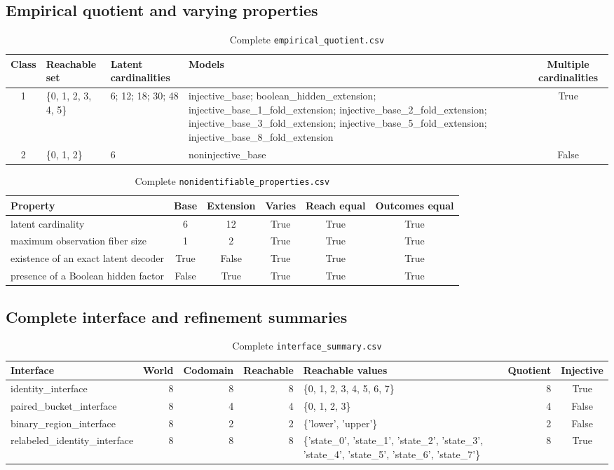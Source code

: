 \subsection{Empirical quotient and varying properties}
\begin{table}[H]
\centering
\caption{Complete \texttt{empirical\_quotient.csv}}
\scriptsize
\begin{tabularx}{\textwidth}{@{}cXlXc@{}}
\toprule
Class & Reachable set & Latent cardinalities & Models & Multiple cardinalities \\
\midrule
1 & \{0, 1, 2, 3, 4, 5\} & 6; 12; 18; 30; 48 & injective\_base; boolean\_hidden\_extension; injective\_base\_1\_fold\_extension; injective\_base\_2\_fold\_extension; injective\_base\_3\_fold\_extension; injective\_base\_5\_fold\_extension; injective\_base\_8\_fold\_extension & True \\
2 & \{0, 1, 2\} & 6 & noninjective\_base & False \\
\bottomrule
\end{tabularx}
\end{table}

\begin{table}[H]
\centering
\caption{Complete \texttt{nonidentifiable\_properties.csv}}
\begin{tabularx}{\textwidth}{@{}Xccccc@{}}
\toprule
Property & Base & Extension & Varies & Reach equal & Outcomes equal \\
\midrule
latent cardinality & 6 & 12 & True & True & True \\
maximum observation fiber size & 1 & 2 & True & True & True \\
existence of an exact latent decoder & True & False & True & True & True \\
presence of a Boolean hidden factor & False & True & True & True & True \\
\bottomrule
\end{tabularx}
\end{table}

\subsection{Complete interface and refinement summaries}
\begin{table}[H]
\centering
\caption{Complete \texttt{interface\_summary.csv}}
\begin{tabularx}{\textwidth}{@{}lrrrXrc@{}}
\toprule
Interface & World & Codomain & Reachable & Reachable values & Quotient & Injective \\
\midrule
identity\_interface & 8 & 8 & 8 & \{0, 1, 2, 3, 4, 5, 6, 7\} & 8 & True \\
paired\_bucket\_interface & 8 & 4 & 4 & \{0, 1, 2, 3\} & 4 & False \\
binary\_region\_interface & 8 & 2 & 2 & \{'lower', 'upper'\} & 2 & False \\
relabeled\_identity\_interface & 8 & 8 & 8 & \{'state\_0', 'state\_1', 'state\_2', 'state\_3', 'state\_4', 'state\_5', 'state\_6', 'state\_7'\} & 8 & True \\
\bottomrule
\end{tabularx}
\end{table}

